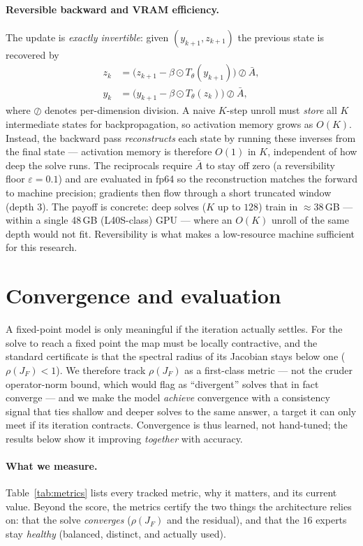 \documentclass[11pt]{article}
\newcommand{\rhoF}{\rho(J_F)}
\begin{document}
\paragraph{Reversible backward and VRAM efficiency.} The update is \emph{exactly
invertible}: given $(y_{k+1}, z_{k+1})$ the previous state is recovered by
\[
\begin{aligned}
z_k &= \bigl(z_{k+1} - \beta \odot T_\theta(y_{k+1})\bigr) \oslash \bar A,\\
y_k &= \bigl(y_{k+1} - \beta \odot T_\theta(z_k)\bigr) \oslash \bar A,
\end{aligned}
\]
where $\oslash$ denotes per-dimension division.
A naive $K$-step unroll must \emph{store} all $K$ intermediate states for
backpropagation, so activation memory grows as $O(K)$. Instead, the backward pass
\emph{reconstructs} each state by running these inverses from the final state ---
activation memory is therefore $O(1)$ in $K$, independent of how deep the solve runs.
The reciprocals require $\bar A$ to stay off zero (a reversibility floor
$\varepsilon=0.1$) and are evaluated in fp64 so the reconstruction matches the forward
to machine precision; gradients then flow through a short truncated window (depth
$3$). The payoff is concrete: deep solves ($K$ up to $128$) train in
$\approx38$\,GB --- within a single 48\,GB (L40S-class) GPU --- where an $O(K)$ unroll
of the same depth would not fit. Reversibility is what makes a low-resource machine
sufficient for this research.

\section{Convergence and evaluation}
\label{sec:fp}

A fixed-point model is only meaningful if the iteration actually settles. For the
solve to reach a fixed point the map must be locally contractive, and the standard
certificate is that the spectral radius of its Jacobian stays below one
($\rhoF<1$). We therefore track $\rhoF$ as a first-class metric --- not the cruder
operator-norm bound, which would flag as ``divergent'' solves that in fact converge
--- and we make the model \emph{achieve} convergence with a consistency signal that
ties shallow and deeper solves to the same answer, a target it can only meet if its
iteration contracts. Convergence is thus learned, not hand-tuned; the results below
show it improving \emph{together} with accuracy.

\paragraph{What we measure.} Table~\ref{tab:metrics} lists every tracked metric, why
it matters, and its current value. Beyond the score, the metrics certify the two
things the architecture relies on: that the solve \emph{converges} ($\rhoF$ and the
residual), and that the $16$ experts stay \emph{healthy} (balanced, distinct, and
actually used).
\end{document}
